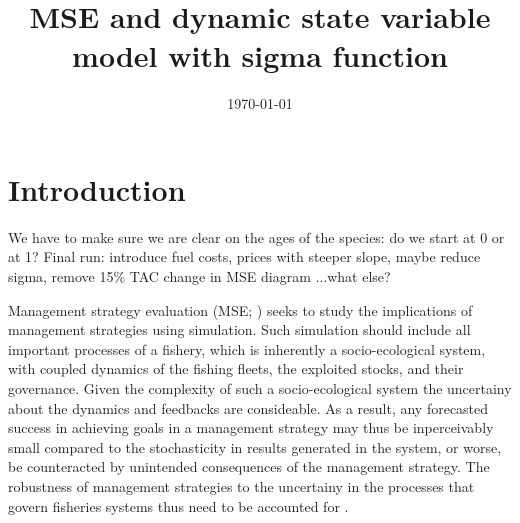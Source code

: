 \documentclass[12pt,oneline,a4paper,numbib]{ouparticle}
\numberwithin{equation}{subsection} %
\begin{document}
\title{MSE and dynamic state variable model with sigma function}

\author{%
\address{European Commission, Joint Research Centre (JRC), Sustainable Resources Directorate, Water and Marine Resources Unit, Via Enrico Fermi 2749, 21027 Ispra, Italy.}
\and
{}
\address{Wageningen Marine Research, PO Box 68, 1970 AB IJmuiden, The Netherlands.}
}


\date{\today}


\maketitle


\section{Introduction}


We have to make sure we are clear on the ages of the species: do we start at 0 or at 1?
Final run: introduce fuel costs, prices with steeper slope, maybe reduce sigma, remove 15\% TAC change in MSE diagram ...what else?

Management strategy evaluation (MSE; \cite{Bunnefeld2011, Sainsbury2000, Smith1994}) seeks to study the implications of management strategies using simulation\cite{Punt2016}. Such simulation should include all important processes of a fishery, which is inherently a socio-ecological system, with coupled dynamics of the fishing fleets, the exploited stocks, and their governance\cite{Punt2016,Rasemeyer2007}. Given the complexity of such a socio-ecological system the uncertainy about the dynamics and feedbacks are consideable. As a result, any forecasted success in achieving goals in a management strategy may thus be inperceivably small compared to the stochasticity in results generated in the system, or worse, be counteracted by unintended consequences of the management strategy. The robustness of management strategies to the uncertainy in the processes that govern fisheries systems thus need to be accounted for \cite{Andersen2010, Kell2007, Prellezo2016, Punt2016}. 
\end{document}
